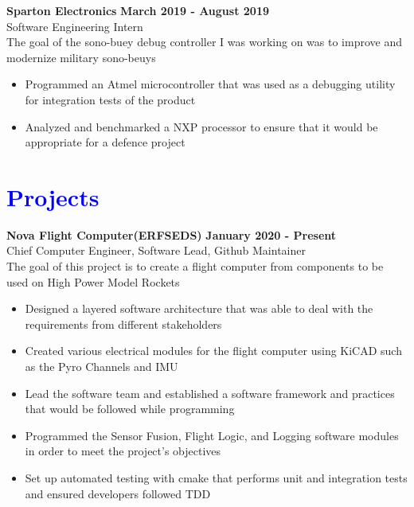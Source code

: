 \documentclass[10pt]{article}
\newcommand{\themeColorOne}{blue}
\newcommand{\sectionColor}{\themeColorOne}
\newcommand{\entrySpacing}{4pt}
\newcommand{\customSection}[1]{
  \section*{\textcolor{\sectionColor}{#1}}
  \vspace{0in}
}
\begin{document}
\noindent\begin{minipage}{\linewidth}
\textbf{Sparton Electronics} \hfill \textbf{March 2019 - August 2019}\\
Software Engineering Intern\hfill \\The goal of the sono-buey debug controller I was working on was to improve and modernize military sono-beuys
\begin{itemize}[noitemsep,nolistsep]
\item Programmed an Atmel microcontroller that was used as a debugging utility for integration tests of the product
\item Analyzed and benchmarked a NXP processor to ensure that it would be appropriate for a defence project
\end{itemize}


\end{minipage}
\vspace{\entrySpacing}


\customSection{Projects}
\noindent\begin{minipage}{\linewidth}
\textbf{Nova Flight Computer(ERFSEDS)} \hfill \textbf{January 2020 - Present}\\
Chief Computer Engineer, Software Lead, Github Maintainer\hfill \\The goal of this project is to create a flight computer from components to be used on High Power Model Rockets
\begin{itemize}[noitemsep,nolistsep]
\item Designed a layered software architecture that was able to deal with the requirements from different stakeholders
\item Created various electrical modules for the flight computer using KiCAD such as the Pyro Channels and IMU
\item Lead the software team and established a software framework and practices that would be followed while programming
\item Programmed the Sensor Fusion, Flight Logic, and Logging software modules in order to meet the project's objectives
\item Set up automated testing with cmake that performs unit and integration tests and ensured developers followed TDD
\end{itemize}


\end{minipage}
\vspace{\entrySpacing}
\end{document}
